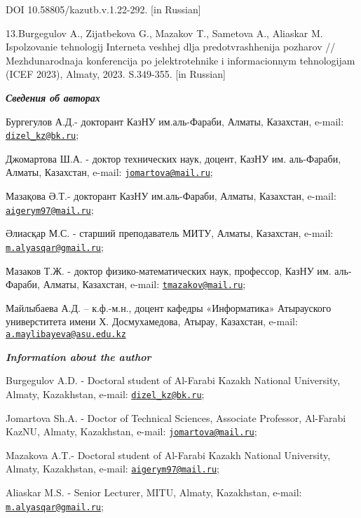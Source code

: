 \documentclass[
]{article}
\begin{document}
DOI 10.58805/kazutb.v.1.22-292. {[}in Russian{]}

13.Burgegulov A., Zijatbekova G., Mazakov T., Sametova A., Aliaskar M.
Ispol\textquotesingle zovanie tehnologij Interneta veshhej dlja
predotvrashhenija pozharov // Mezhdunarodnaja konferencija po
jelektrotehnike i informacionnym tehnologijam (ICEF 2023), Almaty, 2023.
S.349-355. {[}in Russian{]}

\emph{\textbf{Сведения об авторах}}

Бургегулов А.Д.- докторант КазНУ им.аль-Фараби, Алматы, Казахстан,
e-mail: \href{mailto:dizel_kz@bk.ru}{\nolinkurl{dizel\_kz@bk.ru}};

Джомартова Ш.А. - доктор технических наук, доцент, КазНУ им. аль-Фараби,
Алматы, Казахстан, e-mail:
\href{mailto:jomartova@mail.ru}{\nolinkurl{jomartova@mail.ru}};

Мазақова Ә.Т.- докторант КазНУ им.аль-Фараби, Алматы, Казахстан, e-mail:
\href{mailto:aigerym97@mail.ru}{\nolinkurl{aigerym97@mail.ru}};

Әлиасқар М.С. - старший преподаватель МИТУ, Алматы, Казахстан, e-mail:
\href{mailto:m.alyasqar@gmail.ru}{\nolinkurl{m.alyasqar@gmail.ru}};

Мазаков Т.Ж. - доктор физико-математических наук, профессор, КазНУ им.
аль-Фараби, Алматы, Казахстан, e-mail:
\href{mailto:tmazakov@mail.ru}{\nolinkurl{tmazakov@mail.ru}};

Майлыбаева А.Д. -- к.ф.-м.н., доцент кафедры «Информатика» Атырауского
универститета имени Х. Досмухамедова, Атырау, Казахстан, e-mail:
\href{mailto:a.maylibayeva@asu.edu.kz}{\nolinkurl{a.maylibayeva@asu.edu.kz}}

\emph{\textbf{Information about the author}}

Burgegulov A.D. - Doctoral student of Al-Farabi Kazakh National
University, Almaty, Kazakhstan, e-mail:
\href{mailto:dizel_kz@bk.ru}{\nolinkurl{dizel\_kz@bk.ru}};

Jomartova Sh.A. - Doctor of Technical Sciences, Associate Professor,
Al-Farabi KazNU, Almaty, Kazakhstan, e-mail:
\href{mailto:jomartova@mail.ru}{\nolinkurl{jomartova@mail.ru}};

Mazakova A.T.- Doctoral student of Al-Farabi Kazakh National University,
Almaty, Kazakhstan, e-mail:
\href{mailto:aigerym97@mail.ru}{\nolinkurl{aigerym97@mail.ru}};

Aliaskar M.S. - Senior Lecturer, MITU, Almaty, Kazakhstan, e-mail:
\href{mailto:m.alyasqar@gmail.ru}{\nolinkurl{m.alyasqar@gmail.ru}};
\end{document}
